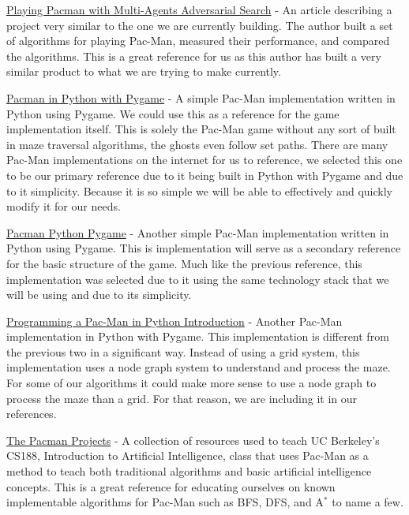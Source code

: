 \documentclass[12pt]{article}
\begin{document}
        \href{https://techs0uls.wordpress.com/2020/02/13/playing-pacman-with-multi-agents-adversarial-search/}{Playing Pacman with Multi-Agents Adversarial Search} - An article describing a project very similar to the one we are currently building. The author built a set of algorithms for playing Pac-Man, measured their performance, and compared the algorithms. This is a great reference for us as this author has built a very similar product to what we are trying to make currently\cite{LiuPacman}.
        
        \href{https://github.com/hbokmann/Pacman/tree/master}{Pacman in Python with Pygame} - A simple Pac-Man implementation written in Python using Pygame. We could use this as a reference for the game implementation itself. This is solely the Pac-Man game without any sort of built in maze traversal algorithms, the ghosts even follow set paths. There are many Pac-Man implementations on the internet for us to reference, we selected this one to be our primary reference due to it being built in Python with Pygame and due to it simplicity. Because it is so simple we will be able to effectively and quickly modify it for our needs\cite{hbokmannPacman}.

        \href{https://github.com/janjilecek/pacman_python_pygame}{Pacman Python Pygame} - Another simple Pac-Man implementation written in Python using Pygame. This is implementation will serve as a secondary reference for the basic structure of the game. Much like the previous reference, this implementation was selected due to it using the same technology stack that we will be using and due to its simplicity\cite{JanPacman}.

        \href{https://justtothepoint.com/code/pacman/}{Programming a Pac-Man in Python Introduction} - Another Pac-Man implementation in Python with Pygame. This implementation is different from the previous two in a significant way. Instead of using a grid system, this implementation uses a node graph system to understand and process the maze. For some of our algorithms it could make more sense to use a node graph to process the maze than a grid. For that reason, we are including it in our references\cite{JustToThePointPacman}.
        
        \href{http://ai.berkeley.edu/project_overview.html}{The Pacman Projects} - A collection of resources used to teach UC Berkeley's CS188, Introduction to Artificial Intelligence, class that uses Pac-Man as a method to teach both traditional algorithms and basic artificial intelligence concepts. This is a great reference for educating ourselves on known implementable algorithms for Pac-Man such as BFS, DFS, and A$^*$ to name a few\cite{BerkeleyPacman}.
        
\end{document}
